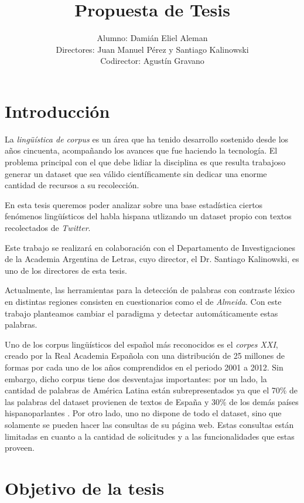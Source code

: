 \documentclass[a4paper,11pt]{article}
\title{Propuesta de Tesis}
\author{Alumno: Damián Eliel Aleman \\
Directores: Juan Manuel Pérez y Santiago Kalinowski \\
Codirector: Agustín Gravano}
\begin{document}
\maketitle


\section*{Introducción}

La \emph{lingüística de corpus} es un área que ha tenido desarrollo sostenido desde los años cincuenta, acompañando los avances que fue haciendo la tecnología. El problema principal con el que debe lidiar la disciplina es que resulta trabajoso generar un dataset que sea válido científicamente sin dedicar una enorme cantidad de recursos a su recolección.

En esta tesis queremos poder analizar sobre una base estadística ciertos
 fenómenos lingüísticos del habla hispana utlizando un dataset propio con
 textos recolectados de \emph{Twitter}.

Este trabajo se realizará en colaboración con el Departamento de Investigaciones de la
Academia Argentina de Letras, cuyo director, el Dr. Santiago Kalinowski, es uno de los directores de esta tesis.

\par Actualmente, las herramientas para la detección de palabras con contraste léxico en distintas regiones
consisten en cuestionarios como el de \emph{Almeida}\cite{ALMEIDA1995}.
Con este trabajo planteamos cambiar el paradigma y detectar automáticamente estas palabras.

Uno de los corpus lingüísticos del español más reconocidos es el \emph{corpes XXI}\cite{CORPES XXI}, creado por la Real Academia Española con una distribución de 25 millones de formas por cada uno de los años comprendidos en el periodo 2001 a 2012. Sin
embargo, dicho corpus tiene dos desventajas importantes: por un
lado, la cantidad de palabras de América Latina están subrepresentados ya que el 70\% de las palabras del dataset provienen de textos de España y 30\% de los demás países hispanoparlantes . Por otro lado, uno no dispone de todo el dataset, sino que solamente se pueden hacer las consultas de su página web. Estas consultas están limitadas en cuanto a la cantidad de solicitudes y a las funcionalidades que estas proveen.


\section*{Objetivo de la tesis}
\end{document}
